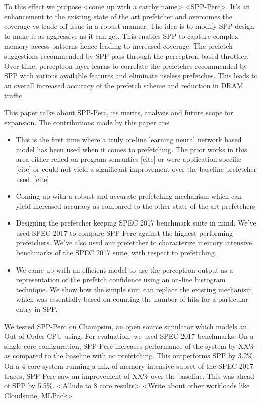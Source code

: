 \documentclass{sig-alternate}
\begin{document}
To this effect we propose <come up with a catchy name> <SPP-Perc>. It's an enhancement to the existing state of the art prefetcher and overcomes the coverage vs trade-off issue in a robust manner. The idea is to modify SPP design to make it as aggressive as it can get. This enables SPP to capture complex memory access patterns hence leading to increased coverage. The prefetch suggestions recommended by SPP pass through the perceptron based throttler. Over time, perceptron layer learns to correlate the prefetches recommended by SPP with various available features and eliminate useless prefetches. This leads to an overall increased accuracy of the prefetch scheme and reduction in DRAM traffic.

\vspace{1ex}This paper talks about SPP-Perc, its merits, analysis and future scope for expansion. The contributions made by this paper are:

\begin{itemize}
\item This is the first time where a truly on-line learning neural network based model has been used when it comes to prefetching. The prior works in this area either relied on program semantics [cite] or were application specific [cite] or could not yield a significant improvement over the baseline prefetcher used. [cite]

\item Coming up with a robust and accurate prefetching mechanism which can yield increased accuracy as compared to the other state of the art prefetchers

\item Designing the prefetcher keeping SPEC 2017 benchmark suite in mind. We've used SPEC 2017 to compare SPP-Perc against the highest performing prefetchers. We've also used our prefetcher to characterize memory intensive benchmarks of the SPEC 2017 suite, with respect to prefetching.

\item We came up with an efficient model to use the perceptron output as a representation of the prefetch confidence using an on-line histogram technique. We show how the simple sum can replace the existing mechanism which was essentially based on counting the number of hits for a particular entry in SPP.

\end{itemize}

We tested SPP-Perc on Champsim, an open source simulator which models an Out-of-Order CPU using. For evaluation, we used SPEC 2017 benchmarks. On a single core configuration, SPP-Perc increases performance of the system by XX\% as compared to the baseline with no prefetching. This outperforms SPP by 3.2\%. On a 4-core system running a mix of memory intensive subset of the SPEC 2017 traces, SPP-Perc saw an improvement of XX\% over the baseline. This was ahead of SPP by 5.5\%. 
<Allude to 8 core results>
<Write about other workloads like Cloudsuite, MLPack>
\end{document}
